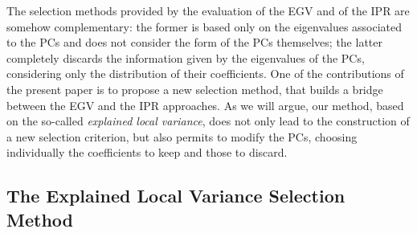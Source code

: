 The selection methods provided by the evaluation of the EGV and of the IPR are somehow complementary: the former is based only on the eigenvalues associated to the PCs and does not consider the form of the PCs themselves; the latter completely discards the information given by the eigenvalues of the PCs, considering only the distribution of their coefficients. One of the contributions of the present paper is to propose a new selection method, that builds a bridge between the EGV and the IPR approaches. As we will argue, our method, based on the so-called {\em explained local variance}, does not only lead to the construction of a new selection criterion, but also permits  to modify the PCs, choosing individually the coefficients to keep and those to discard. 

\subsection{The Explained Local Variance Selection Method}
%
